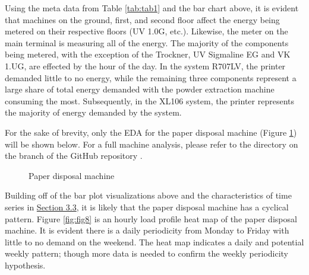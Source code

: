 Using the meta data from Table \ref{tab:tab1} and the bar chart above, it is evident that machines on the ground, first, and second floor affect the energy being metered on their respective floors (UV 1.0G, etc.). Likewise, the meter on the main terminal is measuring all of the energy. The majority of the components being metered, with the exception of the Trockner, UV Sigmaline EG and VK 1.UG, are effected by the hour of the day. In the system R707LV, the printer demanded little to no energy, while the remaining three components represent a large share of total energy demanded with the powder extraction machine consuming the most. Subsequently, in the XL106 system, the printer represents the majority of energy demanded by the system. 

For the sake of brevity, only the EDA for the paper disposal machine (Figure \ref{fig:fig7}) will be shown below. For a full machine analysis, please refer to the  directory on the  branch of the GitHub repository \cite{Stechschulte_Gaussian_Processes_for_2022}. 

\begin{figure}[h]
  \centering
  \graphicspath{ {./images/} }
  \hfill
  \caption{Paper disposal machine}
  \label{fig:fig7}
\end{figure}

Building off of the bar plot visualizations above and the characteristics of time series in \hyperlink{subsection3.3}{Section 3.3}, it is likely that the paper disposal machine has a cyclical pattern. Figure \ref{fig:fig8} is an hourly load profile heat map of the paper disposal machine. It is evident there is a daily periodicity from Monday to Friday with little to no demand on the weekend. The heat map indicates a daily and potential weekly pattern; though more data is needed to confirm the weekly periodicity hypothesis. 

